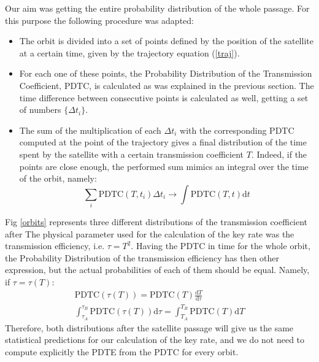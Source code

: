 \documentclass[%
 reprint,
 amsmath,amssymb,
 aps,
]{revtex4-1}
\begin{document}
Our aim was getting the entire probability distribution of the whole passage. For this purpose the following procedure was adapted:
\renewcommand{\labelitemi}{$\blacksquare$}
 \begin{itemize}
   \item  The orbit is divided into a set of points defined by the position of the satellite at a certain time, given by the trajectory equation (\ref{traj}).
   \item For each one of these points, the Probability Distribution of the Transmission Coefficient, PDTC, is calculated as was explained in the previous section. The time difference between consecutive points is calculated as well, getting a set of numbers $\{\Delta t_i\}$.
   \item The sum of the multiplication of each $\Delta t_i$ with the corresponding PDTC computed at the point of the trajectory gives a final distribution of the time spent by the satellite with a certain transmission coefficient $T$. Indeed, if the points are close enough, the performed sum mimics an integral over the time of the orbit, namely:
   \begin{equation}
       \sum_i\mathrm{PDTC}(T,t_i)\Delta t_i\rightarrow \int \mathrm{PDTC}(T,t)\mathrm{d}t
   \end{equation}
 \end{itemize}
Fig \ref{orbits} represents three different distributions of the transmission coefficient after
The physical parameter used for the calculation of the key rate was the transmission efficiency, i.e. $\tau=T^2$. Having the PDTC in time for the whole orbit, the Probability Distribution of the transmission efficiency has then other expression, but the actual probabilities of each of them should be equal. Namely, if $\tau = \tau(T)$:
\begin{equation}
\begin{split}
     \mathrm{PDTC}(\tau(T)) = \mathrm{PDTC}(T)\frac{\mathrm{d}T}{\mathrm{d}\tau}\\
         \int_{\tau_A}^{\tau_B}\mathrm{PDTC}(\tau(T))\mathrm{d}\tau =\int_{T_A}^{T_B}\mathrm{PDTC}(T)\mathrm{d}T
    \end{split}
\end{equation}
Therefore, both distributions after the satellite passage will give us the same statistical predictions for our calculation of the key rate, and we do not need to compute explicitly the PDTE from the PDTC for every orbit.
\end{document}
